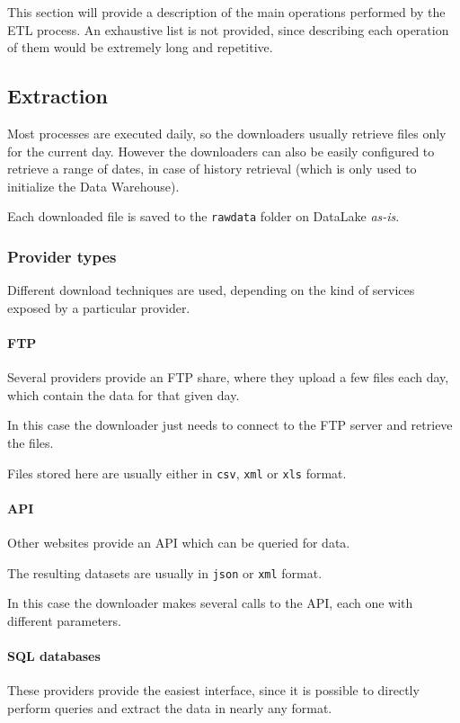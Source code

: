 This section will provide a description of the main operations performed by the ETL process.
An exhaustive list is not provided, since describing each operation of them would be extremely long and repetitive.

\subsection{Extraction}
    Most processes are executed daily, so the downloaders usually retrieve files only for the current day.
    However the downloaders can also be easily configured to retrieve a range of dates, in case of history retrieval (which is only used to initialize the Data Warehouse).
    
    Each downloaded file is saved to the \texttt{rawdata} folder on DataLake \textit{as-is}.
    
    \subsubsection{Provider types} \label{section:etl:provider_types}
        Different download techniques are used, depending on the kind of services exposed by a particular provider.
        
        \paragraph{FTP}
            Several providers provide an FTP share, where they upload a few files each day, which contain the data for that given day.
            
            In this case the downloader just needs to connect to the FTP server and retrieve the files.
            
            Files stored here are usually either in \texttt{csv}, \texttt{xml} or \texttt{xls} format.
            
        \paragraph{API}
            Other websites provide an API which can be queried for data.
            
            The resulting datasets are usually in \texttt{json} or \texttt{xml} format.
            
            In this case the downloader makes several calls to the API, each one with different parameters.
            
        \paragraph{SQL databases}
            These providers provide the easiest interface, since it is possible to directly perform queries and extract the data in nearly any format.
            
